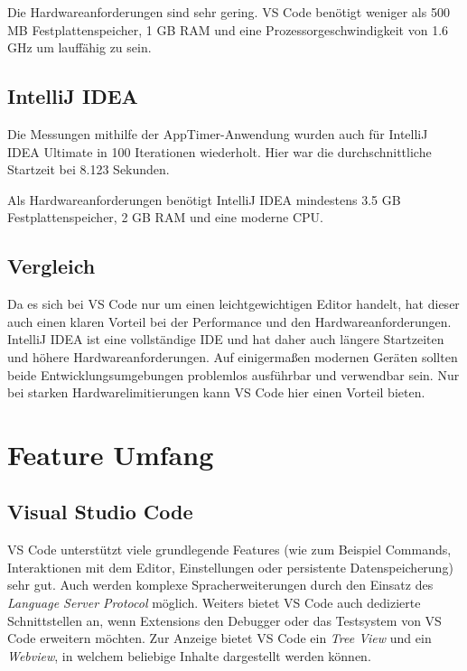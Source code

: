 Die Hardwareanforderungen sind sehr gering. VS Code benötigt weniger
als 500 MB Festplattenspeicher, 1 GB RAM und eine Prozessorgeschwindigkeit
von 1.6 GHz um lauffähig zu sein.

\subsection{IntelliJ IDEA}

Die Messungen mithilfe der AppTimer-Anwendung wurden auch
für IntelliJ IDEA Ultimate in 100 Iterationen wiederholt.
Hier war die durchschnittliche Startzeit bei 8.123 Sekunden.

Als Hardwareanforderungen benötigt IntelliJ IDEA
mindestens 3.5 GB Festplattenspeicher, 2 GB RAM und eine
moderne CPU.

\subsection{Vergleich}

Da es sich bei VS Code nur um einen leichtgewichtigen Editor handelt,
hat dieser auch einen klaren Vorteil bei der Performance 
und den Hardwareanforderungen.
IntelliJ IDEA ist eine vollständige IDE und hat daher auch längere
Startzeiten und höhere Hardwareanforderungen.
Auf einigermaßen modernen Geräten sollten beide Entwicklungsumgebungen
problemlos ausführbar und verwendbar sein. Nur bei starken
Hardwarelimitierungen kann VS Code hier einen Vorteil bieten.


\section{Feature Umfang}
\label{sec:Vergleich_FeatureUmfang}

\subsection{Visual Studio Code}

VS Code unterstützt viele grundlegende Features (wie zum Beispiel 
Commands, Interaktionen mit dem Editor, Einstellungen oder persistente
Datenspeicherung) sehr gut. Auch werden komplexe Spracherweiterungen
durch den Einsatz des \emph{Language Server Protocol} möglich.
Weiters bietet VS Code auch dedizierte Schnittstellen an, wenn Extensions
den Debugger oder das Testsystem von VS Code erweitern möchten.
Zur Anzeige bietet VS Code ein \emph{Tree View} und ein 
\emph{Webview}, in welchem beliebige Inhalte dargestellt werden können.

